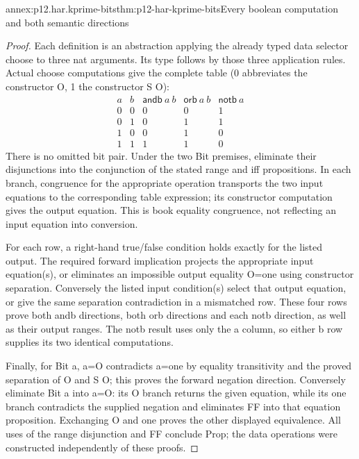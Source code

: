 \begin{annexitem}{annex:p12.har.kprime-bits}{thm:p12-har-kprime-bits}{Every boolean computation and both semantic directions}
\begin{proof}
Each definition is an abstraction applying the already typed data
selector choose to three nat arguments. Its type follows by those
three application rules. Actual choose computations give the complete
table (0 abbreviates the constructor O, 1 the constructor S O):
\[
\begin{array}{cc|ccc}
 a&b&\mathsf{andb}\ a\ b&\mathsf{orb}\ a\ b&\mathsf{notb}\ a\\\hline
 0&0&0&0&1\\
 0&1&0&1&1\\
 1&0&0&1&0\\
 1&1&1&1&0
\end{array}
\]
There is no omitted bit pair. Under the two Bit premises, eliminate
their disjunctions into the conjunction of the stated range and iff
propositions. In each branch, congruence for the appropriate operation
transports the two input equations to the corresponding table expression;
its constructor computation gives the output equation. This is book
equality congruence, not reflecting an input equation into conversion.

For each row, a right-hand true/false condition holds exactly for the
listed output. The required forward implication projects the appropriate
input equation(s), or eliminates an impossible output equality O=one
using constructor separation. Conversely the listed input condition(s)
select that output equation, or give the same separation contradiction
in a mismatched row. These four rows prove both andb directions, both
orb directions and each notb direction, as well as their output ranges.
The notb result uses only the a column, so either b row supplies its
two identical computations.

Finally, for Bit a, a=O contradicts a=one by equality transitivity and
the proved separation of O and S O; this proves the forward negation
direction. Conversely eliminate Bit a into a=O: its O branch returns
the given equation, while its one branch contradicts the supplied
negation and eliminates FF into that equation proposition. Exchanging
O and one proves the other displayed equivalence. All uses of the
range disjunction and FF conclude Prop; the data operations were
constructed independently of these proofs.
\end{proof}
\end{annexitem}

